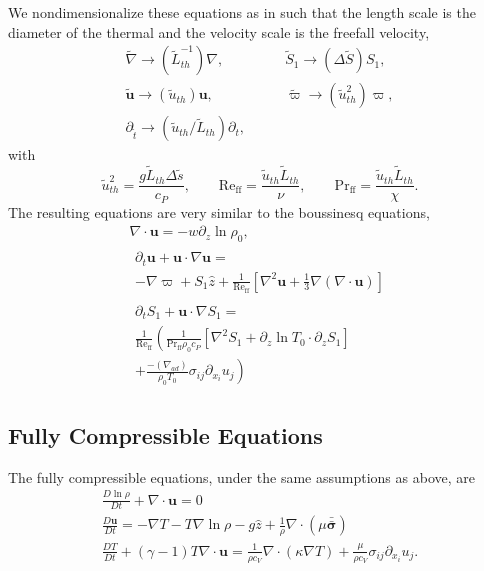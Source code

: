 \documentclass[twocolumn, amsmath, amsfonts, amssymb, trackchanges]{aastex62}
\newcommand{\DivU}{\ensuremath{\nabla\cdot\bm{u}}}
\newcommand{\td}[1]{\ensuremath{\widetilde{#1}}}
\newcommand{\grad}{\ensuremath{\nabla}}
\newcommand{\lilstressT}{\ensuremath{\bm{\bar{\bar{\sigma}}}}}
\begin{document}
We nondimensionalize these equations as in \citet{lecoanet&jeevanjee2018} such that
the length scale is the diameter of the thermal and the velocity scale is the freefall
velocity,
\begin{equation}
\begin{split}
\td{\grad}\rightarrow(\td{L}_{th}^{-1})\grad, \qquad&
\td{S}_1 \rightarrow(\Delta\td{S})S_1,\\
\td{\bm{u}} \rightarrow (\td{u}_{th})\bm{u}, \qquad&
\td{\varpi} \rightarrow (\td{u}_{th}^2)\varpi,\\
\partial_{\tilde{t}} \rightarrow (\td{u}_{th}/\td{L}_{th})\partial_t,\qquad&
\end{split}
\end{equation}
with
\begin{equation}
\tilde{u}_{th}^2 = \frac{g \tilde{L}_{th} \Delta \tilde{s}}{c_P}, \qquad
\text{Re}_{\text{ff}} = \frac{\tilde{u}_{th} \tilde{L}_{th}}{\nu}, \qquad
\text{Pr}_{\text{ff}} = \frac{\tilde{u}_{th} \tilde{L}_{th}}{\chi}.
\end{equation}
The resulting equations are very similar to the boussinesq equations,
\begin{gather}
\DivU = -w \partial_z \ln\rho_0, \\
\begin{split}
\partial_t \bm{u} + \bm{u}\cdot\grad\bm{u} = \\
- \grad \varpi + S_1\hat{z} 
+ \frac{1}{\text{Re}_{\text{ff}}}\left[\grad^2 \bm{u} + \frac{1}{3}\grad(\DivU)\right] 
\end{split}\\
\begin{split}
\partial_t S_1 + \bm{u}\cdot\grad S_1 = \\
\frac{1}{\text{Re}_{\text{ff}}}\left(\frac{1}{\text{Pr}_{\text{ff}}\rho_0c_P }[\grad^2 S_1 + \partial_z\ln T_0 \cdot\partial_z S_1]\right.\\\left.
+ \frac{-(\grad_{ad})}{\rho_0 T_0}\sigma_{ij}\partial_{x_i}u_j \right)
\end{split}
\end{gather}

\subsection{Fully Compressible Equations}
The fully compressible equations, under the same assumptions as above, are
\begin{gather}
\frac{D \ln\rho}{Dt} + \DivU = 0 \\
\frac{D \bm{u}}{D t} = -\grad T - T\grad\ln\rho - g\hat{z} + \frac{1}{\rho}\grad\cdot\left(\mu\lilstressT\right) \\
\frac{D T}{Dt} + (\gamma-1)T\DivU  = \frac{1}{\rho c_V}\grad\cdot\left(\kappa \grad T\right) + \frac{\mu}{\rho c_V}\sigma_{ij}\partial_{x_i}u_j.
\end{gather}
\end{document}
